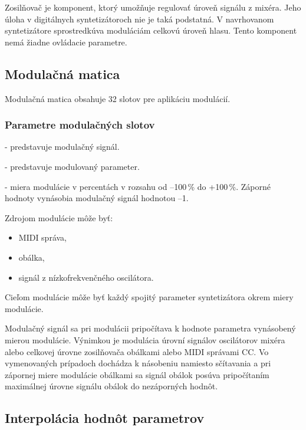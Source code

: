 Zosilňovač je komponent, ktorý umožňuje regulovať úroveň signálu z mixéra. Jeho úloha v digitálnych syntetizátoroch nie je taká podstatná. V navrhovanom syntetizátore sprostredkúva moduláciám celkovú úroveň hlasu. Tento komponent nemá žiadne ovládacie parametre.

\subsection{Modulačná matica}

Modulačná matica obsahuje 32 slotov pre aplikáciu modulácií.

\subsubsection{Parametre modulačných slotov}
\begin{description}
\setlength{\itemsep}{-0.5ex}
\item[Zdroj modulácie] - predstavuje modulačný signál.
\item[Cieľ modulácie] - predstavuje modulovaný parameter.
\item[Miera modulácie] - miera modulácie v percentách v rozsahu od --100\,\% do +100\,\%. Záporné hodnoty vynásobia modulačný signál hodnotou --1.
\end{description}

\noindent
Zdrojom modulácie môže byť:
\begin{itemize}
\setlength{\itemsep}{-0.5ex}
\item MIDI správa,
\item obálka,
\item signál z nízkofrekvenčného oscilátora.
\end{itemize}

Cieľom modulácie môže byť každý spojitý parameter syntetizátora okrem miery modulácie.

Modulačný signál sa pri modulácii pripočítava k hodnote parametra vynásobený mierou modulácie. Výnimkou je modulácia úrovní signálov oscilátorov mixéra alebo celkovej úrovne zosilňovača obálkami alebo MIDI správami CC. Vo vymenovaných prípadoch dochádza k násobeniu namiesto sčítavania a pri zápornej miere modulácie obálkami sa signál obálok posúva pripočítaním maximálnej úrovne signálu obálok do nezáporných hodnôt. 

\subsection{Interpolácia hodnôt parametrov}

